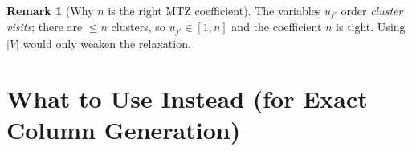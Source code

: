 \documentclass[11pt,a4paper]{article}
\theoremstyle{plain}
\theoremstyle{definition}
\newtheorem{remark}[theorem]{Remark}
\begin{document}
\begin{thmbox}
	\begin{remark}[Why $n$ is the right MTZ coefficient]
		The variables $u_{j'}$ order \emph{cluster visits}; there are $\le n$ clusters, so
		$u_{j'}\in[1,n]$ and the coefficient $n$ is tight. Using $|V|$ would only weaken the
		relaxation.
	\end{remark}
\end{thmbox}

\section{What to Use Instead (for Exact Column Generation)}
\label{sec:safe}
\end{document}
